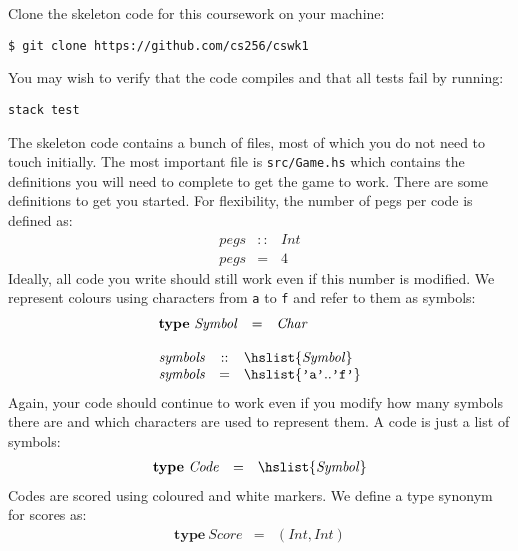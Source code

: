\documentclass{../cs256-shared/cs256}
\begin{document}
Clone the skeleton code for this coursework on your machine:
\begin{verbatim}
$ git clone https://github.com/cs256/cswk1
\end{verbatim}
You may wish to verify that the code compiles and that all tests fail by running:
\begin{verbatim}
stack test
\end{verbatim}
The skeleton code contains a bunch of files, most of which you do not need to touch initially. The most important file is \texttt{src/Game.hs} which contains the definitions you will need to complete to get the game to work. There are some definitions to get you started. For flexibility, the number of pegs per code is defined as:
\begin{displaymath}
\begin{array}{lcl}
\mathit{pegs} & :: & \mathit{Int} \\
\mathit{pegs} & = & 4
\end{array}
\end{displaymath}
Ideally, all code you write should still work even if this number is modified. We represent colours using characters from \texttt{a} to \texttt{f} and refer to them as symbols:
\begin{displaymath}
\begin{array}{l}
\begin{array}{lcl}
\mathbf{type}~\mathit{Symbol} & = & \mathit{Char}
\end{array} \\\\
\begin{array}{lcl}
\mathit{symbols} & :: & \hslist{\mathit{Symbol}} \\
\mathit{symbols} & = & \hslist{\texttt{'a'}..\texttt{'f'}}
\end{array}
\end{array}
\end{displaymath}
Again, your code should continue to work even if you modify how many symbols there are and which characters are used to represent them. A code is just a list of symbols:
\begin{displaymath}
\begin{array}{lcl}
\mathbf{type}~\mathit{Code} & = & \hslist{\mathit{Symbol}}
\end{array}
\end{displaymath}
Codes are scored using coloured and white markers. We define a type synonym for scores as:
\begin{displaymath}
\begin{array}{lcl}
\mathbf{type}~\mathit{Score} & = & (\mathit{Int}, \mathit{Int})
\end{array}
\end{displaymath}
\end{document}
